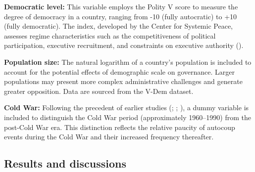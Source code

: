 \documentclass[
  12pt,
]{report}
\begin{document}
\textbf{Democratic level:} This variable employs the Polity V score to
measure the degree of democracy in a country, ranging from -10 (fully
autocratic) to +10 (fully democratic). The index, developed by the
Center for Systemic Peace, assesses regime characteristics such as the
competitiveness of political participation, executive recruitment, and
constraints on executive authority ().

\textbf{Population size:} The natural logarithm of a country's
population is included to account for the potential effects of
demographic scale on governance. Larger populations may present more
complex administrative challenges and generate greater opposition. Data
are sourced from the V-Dem dataset.

\textbf{Cold War:} Following the precedent of earlier studies
(;
;
), a dummy variable is
included to distinguish the Cold War period (approximately 1960--1990)
from the post-Cold War era. This distinction reflects the relative
paucity of autocoup events during the Cold War and their increased
frequency thereafter.

\subsection*{Results and discussions}\label{results-and-discussions}
\end{document}

